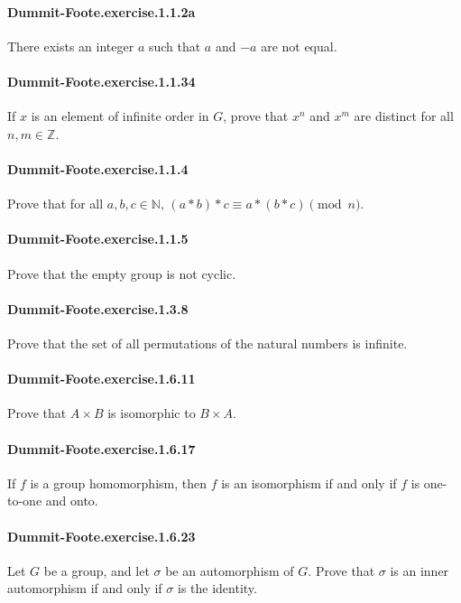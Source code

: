 \documentclass{article}
\begin{document}
\paragraph{Dummit-Foote.exercise.1.1.2a} There exists an integer $a$ such that $a$ and $-a$ are not equal.

\paragraph{Dummit-Foote.exercise.1.1.34} If $x$ is an element of infinite order in $G$, prove that $x^n$ and $x^m$ are distinct for all $n, m\in\mathbb{Z}$.

\paragraph{Dummit-Foote.exercise.1.1.4} Prove that for all $a, b, c \in \mathbb{N}$, $(a * b) * c \equiv a * (b * c) \pmod{n}$.

\paragraph{Dummit-Foote.exercise.1.1.5} Prove that the empty group is not cyclic.

\paragraph{Dummit-Foote.exercise.1.3.8} Prove that the set of all permutations of the natural numbers is infinite.

\paragraph{Dummit-Foote.exercise.1.6.11} Prove that $A\times B$ is isomorphic to $B\times A$.

\paragraph{Dummit-Foote.exercise.1.6.17} If $f$ is a group homomorphism, then $f$ is an isomorphism if and only if $f$ is one-to-one and onto.

\paragraph{Dummit-Foote.exercise.1.6.23} Let $G$ be a group, and let $\sigma$ be an automorphism of $G$. Prove that $\sigma$ is an inner automorphism if and only if $\sigma$ is the identity.
\end{document}
